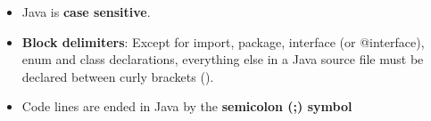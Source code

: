 
\begin{flushleft}
	
	\begin{itemize}
		
		\item Java is \textbf{case sensitive}.
		\item \textbf{Block delimiters}: Except for import, package, interface (or @interface), enum and class declarations, everything else in a Java source file must be declared between curly brackets ({}).
		\item Code lines are ended in Java by the \textbf{semicolon (;) symbol}

	\end{itemize}	
	
	
\end{flushleft}
\newpage
